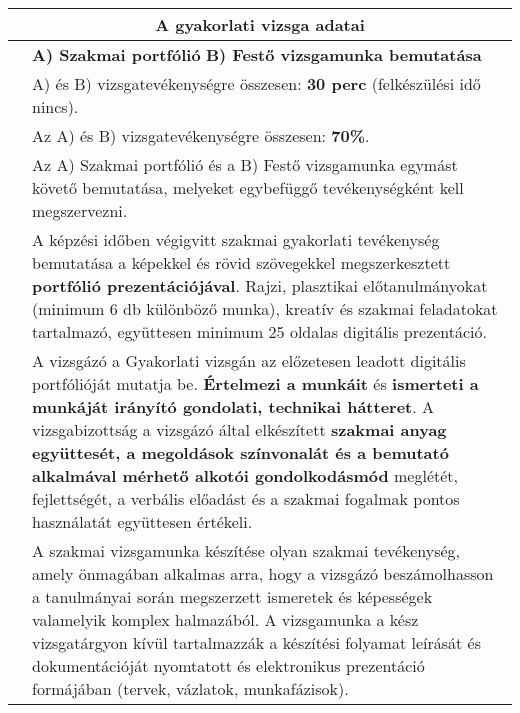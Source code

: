 \begin{center}
	\begin{longtable}{ | p{} | p{} | }
		
		\hline
		\multicolumn{2}{|c|}{\textbf{A gyakorlati vizsga adatai}}
		\\ \hline
		
		\hline
		\centering{Gyakorlati vizsgatevékenység hivatalos ismertetése}
		& 
		\textbf{A) Szakmai portfólió} \newline
		\textbf{B) Festő vizsgamunka bemutatása}
		\\ \hline
		
		\centering{A vizsgafeladat időtartama}
		&
		A) és B) vizsgatevékenységre összesen: \textbf{30 perc}
		(felkészülési idő nincs).
		\\\hline
		
		\centering{Értékelési súlyaránya}
		&
		Az A) és B) vizsgatevékenységre összesen:\textbf{ 70\%}.
		\\\hline
		
		\centering{Vizsgafeladat ismertetése}
		&
		 Az A) Szakmai portfólió és a B) Festő vizsgamunka egymást követő bemutatása, melyeket egybefüggő tevékenységként kell megszervezni.
		\\\hline
		
		\centering{A) A Szakmai portfólió bemutatása}
		&
		A képzési időben végigvitt szakmai gyakorlati tevékenység bemutatása a képekkel és rövid szövegekkel megszerkesztett \textbf{portfólió prezentációjával}. Rajzi, plasztikai előtanulmányokat (minimum 6 db különböző munka), kreatív és szakmai feladatokat tartalmazó, együttesen minimum 25 oldalas digitális prezentáció.
		\\\hline
		
		\centering{A Szakmai portfólió anyagának és bemutatásának értékelése}
		&
		A vizsgázó a Gyakorlati vizsgán az előzetesen leadott digitális portfólióját mutatja be.\textbf{ Értelmezi a munkáit} és \textbf{ismerteti a munkáját irányító gondolati, technikai hátteret}. A vizsgabizottság a vizsgázó által elkészített \textbf{szakmai anyag együttesét, a megoldások színvonalát és a bemutató alkalmával mérhető alkotói gondolkodásmód} meglétét, fejlettségét, a verbális előadást és a szakmai fogalmak pontos használatát együttesen értékeli.
		\\\hline
		
		\centering{B) Szakmai vizsgamunka (vizsgaremek) bemutatása és prezentáció követelményei és annak értékelése}
		&
		A szakmai vizsgamunka készítése olyan szakmai tevékenység, amely önmagában alkalmas arra, hogy a vizsgázó beszámolhasson a tanulmányai során megszerzett ismeretek és képességek valamelyik komplex halmazából. A vizsgamunka a kész vizsgatárgyon kívül tartalmazzák a készítési folyamat leírását és dokumentációját nyomtatott és elektronikus prezentáció formájában (tervek, vázlatok, munkafázisok).
		\\\hline
		
	\end{longtable}
\end{center}


\cleardoublepage